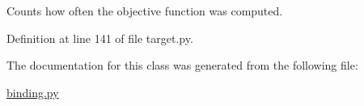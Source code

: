 Counts how often the objective function was computed. 



Definition at line 141 of file target.\-py.



The documentation for this class was generated from the following file\-:\begin{DoxyCompactItemize}
\item 
\hyperlink{binding_8py}{binding.\-py}\end{DoxyCompactItemize}
